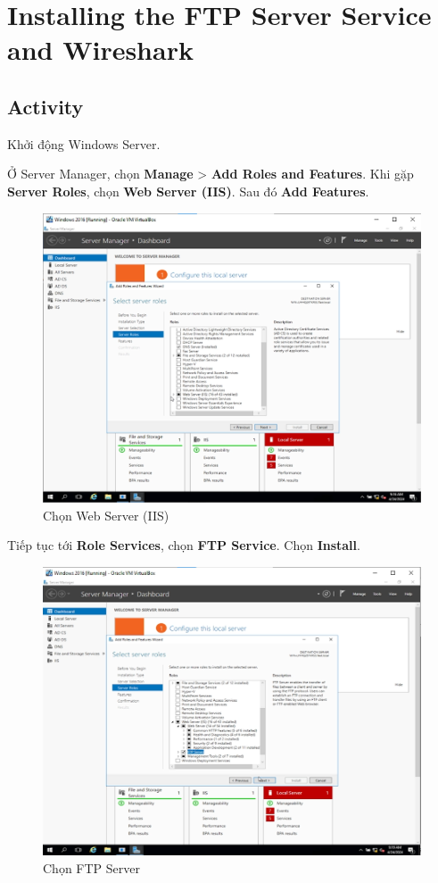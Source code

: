 \newpage
\section{Installing the FTP Server Service and Wireshark}

\subsection{Activity}

 Khởi động Windows Server.

 Ở Server Manager, chọn \textbf{Manage} > \textbf{Add Roles and Features}. Khi gặp \textbf{Server Roles}, chọn \textbf{Web Server (IIS)}. Sau đó \textbf{Add Features}.

\begin{figure}[!htb]
    \centering
    \includegraphics[width=0.7\linewidth]{figure//chapter9//lab9_2/setup_web_server.png}
    \caption{Chọn Web Server (IIS)}
    \label{fig:enter-label}
\end{figure}

 Tiếp tục tới \textbf{Role Services}, chọn \textbf{FTP Service}. Chọn \textbf{Install}.

\begin{figure}[!htb]
    \centering
    \includegraphics[width=0.7\linewidth]{figure//chapter9//lab9_2/ftp_server.png}
    \caption{Chọn FTP Server}
    \label{fig:enter-label}
\end{figure}

